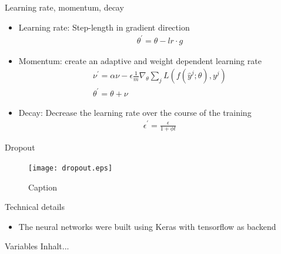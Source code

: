 \begin{frame}{Learning rate, momentum, decay}
\begin{itemize}
    \item Learning rate: Step-length in gradient direction
    \begin{align}
    \theta^{\prime} = \theta - lr \cdot g
    \end{align}
    \item Momentum: create an adaptive and weight dependent learning rate
    \begin{align}
    \nu^{\prime} = \alpha \nu - \epsilon \frac{1}{m} \nabla_{\theta} \sum_j L(f(\hat{y}^j; \theta), y^j)\\
    \theta^{\prime} = \theta + \nu
    \end{align}
    \item Decay: Decrease the learning rate over the course of the training
    \begin{align}
    \epsilon^{\prime} = \frac{\epsilon}{1 + \phi t}
    \end{align}
\end{itemize}
\end{frame}


\begin{frame}{Dropout}
\begin{figure}
    \centering
    \texttt{[image: dropout.eps]}
    \caption{Caption}
    \label{fig:my_label}
\end{figure}
\end{frame}

\begin{frame}{Technical details}
    \begin{itemize}
        \item The neural networks were built using Keras \cite{chollet2015keras} with tensorflow \cite{tensorflow2015-whitepaper} as backend
    \end{itemize}
\end{frame}

\begin{frame}{Variables}
Inhalt...
\end{frame}
